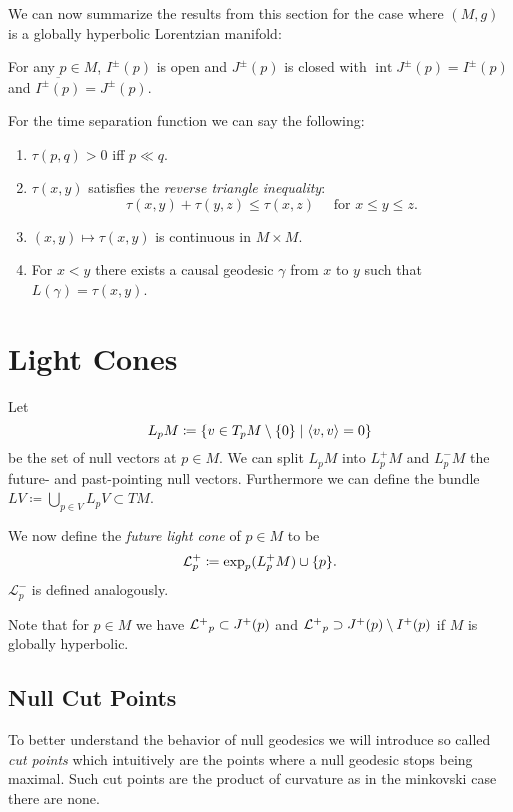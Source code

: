 \begin{remark}\label{rmk:causalitysummary}
We can now summarize the results from this section for the case where $(M,g)$ is a globally hyperbolic Lorentzian manifold:

For any $p\in M$, $I^\pm(p)$ is open and $J^\pm(p)$ is closed with $\operatorname{int} J^\pm(p) = I^\pm(p)$ and $\overline{I^\pm(p)}=J^\pm(p)$.

For the time separation function we can say the following:
\begin{enumerate}[label={\textnormal{(\arabic*)}}]
    \item $\tau(p,q)>0$ iff $p\ll q$.
    \item $\tau(x,y)$ satisfies the \emph{reverse triangle inequality}:
    \[
    \tau(x,y) + \tau(y,z) \leq \tau(x,z) \quad \text{ for }x\leq y\leq z.
    \]
    \item $(x,y)\mapsto \tau(x,y)$ is continuous in $M\times M$.
    \item For $x<y$ there exists a causal geodesic $\gamma$ from $x$ to $y$ such that $L(\gamma)=\tau(x,y)$.
\end{enumerate}

\end{remark}


\section{Light Cones}


\begin{definition}
Let 
\[
L_pM \coloneqq \{ v\in T_pM\setminus\{0\} \mid \left\langle v,v \right\rangle=0 \}
\]
be the set of null vectors at $p\in M$. We can split $L_pM$ into $L^+_pM$ and $L^-_pM$ the future- and past-pointing null vectors. Furthermore we can define the bundle $LV\coloneqq\bigcup_{p\in V}L_pV\subset TM$.

We now define the \emph{future light cone} of $p\in M$ to be 
\[
\mathcal{L}^+_p \coloneqq \exp_p(L^+_pM) \cup \{p\}.
\]
$\mathcal{L}^-_p$ is defined analogously.
\end{definition}
Note that for $p\in M$ we have $\mathcal{L^+}_p\subset J^+(p)$ and $\mathcal{L^+}_p\supset J^+(p)\setminus I^+(p)$ if $M$ is globally hyperbolic.



\subsection{Null Cut Points}
To better understand the behavior of null geodesics we will introduce so called \emph{cut points} which intuitively are the points where a null geodesic stops being maximal. Such cut points are the product of curvature as in the minkovski case there are none.

